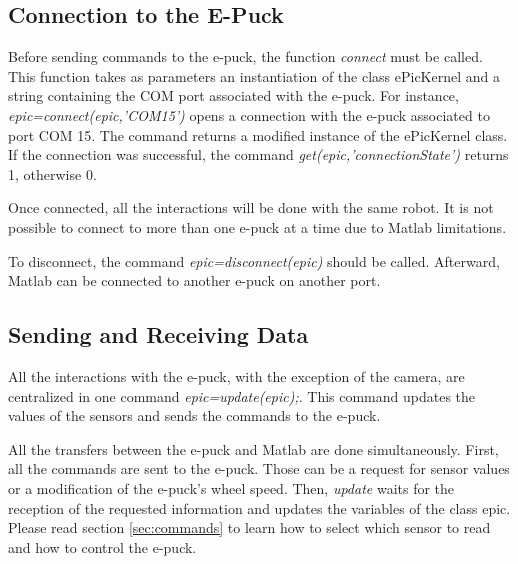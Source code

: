 \documentclass[11pt,oneside,english,a4paper]{article}
\begin{document}
\subsection{Connection to the E-Puck}
Before sending commands to the e-puck, the function \emph{connect} must be called. This function takes as parameters an instantiation of the class ePicKernel and a string containing the COM port associated with the e-puck. For instance,  \emph{epic=connect(epic,'COM15')} opens a connection with the e-puck associated to port COM 15. The command returns a modified instance of the ePicKernel class. If the connection was successful, the command \emph{get(epic,'connectionState')} returns 1, otherwise 0.
\par Once connected, all the interactions will be done with the same robot. It is not possible to connect to more than one e-puck at a time due to Matlab limitations.
\par To disconnect, the command \emph{epic=disconnect(epic)} should be called. Afterward, Matlab can be connected to another e-puck on another port.

\subsection{Sending and Receiving Data}
All the interactions with the e-puck, with the exception of the camera, are centralized in one command \emph{epic=update(epic);}. This command updates the values of the sensors and sends the commands to the e-puck. 
\par All the transfers between the e-puck and Matlab are done simultaneously. First, all the commands are sent to the e-puck. Those can be a request for sensor values or a modification of the e-puck's wheel speed. Then, \emph{update} waits for the reception of the requested information and updates the variables of the class epic. Please read section \ref{sec:commands} to learn how to select which sensor to read and how to control the e-puck.
\end{document}
